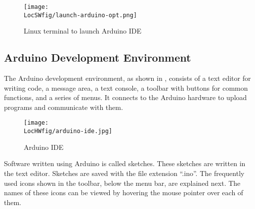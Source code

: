 \begin{figure}
      \centering
      \texttt{[image: \\LocSWfig/launch-arduino-opt.png]}
      \caption{Linux terminal to launch Arduino IDE}
      \label{arduino-opt}
\end{figure}


\subsection{Arduino Development Environment}
\label{sec:Arduino-IDE}
The Arduino development environment, as shown in ,
consists of 
a text editor for writing code, a message area, a text console, a
toolbar with buttons for common functions, and a series of menus. It
connects to the Arduino hardware to upload programs and communicate
with them.

\begin{figure}
      \centering
      \texttt{[image: \\LocHWfig/arduino-ide.jpg]}
      \caption{Arduino IDE}
      \label{ard-ide}
\end{figure}
Software written using Arduino is called sketches. These sketches are
written in the text editor. Sketches are saved with the file extension
``.ino''. The frequently used icons shown in the toolbar, below the menu bar, are explained next. The names of these icons can be viewed by hovering the mouse pointer over each of them.


